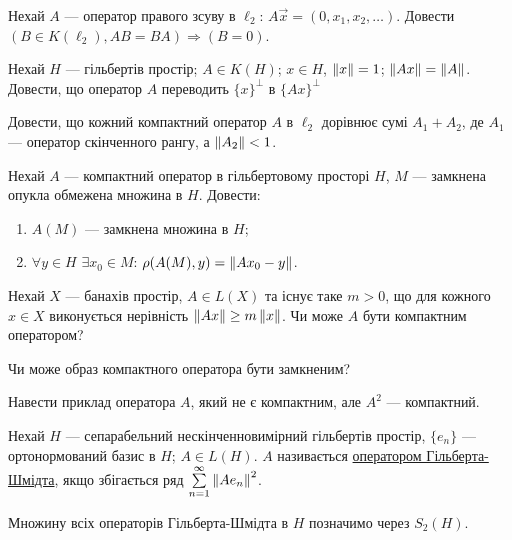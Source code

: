 \begin{exercise}
    Нехай $A$ --- оператор правого зсуву в $\ell_2$: $A\vec{x} = (0,x_1,x_2,\dots)$.
    Довести $(B \in K(\ell_2), AB=BA) \Rightarrow (B=0)$.
\end{exercise}

\begin{exercise}\label{N:1_5_33}
    Нехай $H$ --- гільбертів простір; $A \in K(H)$; $x \in H$, $\left\lVert x\right\rVert = 1$;
    $\left\lVert Ax\right\rVert = \left\lVert A\right\rVert$. Довести, що оператор $A$ переводить $\{x\}^\perp$
    в $\{Ax\}^\perp$
\end{exercise}

\begin{exercise}
    Довести, що кожний компактний оператор $A$ в $\ell_2$ дорівнює сумі $A_1 + A_2$,
    де $A_1$ --- оператор скінченного рангу, а $\left\lVert A_2\right\rVert<1$.
\end{exercise}

\begin{exercise}
    Нехай $A$ --- компактний оператор в гільбертовому просторі $H$, $M$ ---
    замкнена опукла обмежена множина в $H$. Довести:
    \begin{enumerate}
        \item $A(M)$ --- замкнена множина в $H$;
        \item $\forall y \in H$ $\exists x_0 \in M$: $\rho(A(M),y) = \left\lVert Ax_0 - y\right\rVert$.
    \end{enumerate}
\end{exercise}

\begin{exercise}
    Нехай $X$ --- банахів простір, $A \in L(X)$ та існує таке $m>0$, що для кожного
    $x \in X$ виконується нерівність $\left\lVert Ax\right\rVert \geq m \left\lVert x\right\rVert$. Чи може $A$ бути
    компактним оператором?
\end{exercise}

\begin{exercise}
    Чи може образ компактного оператора бути замкненим?
\end{exercise}

\begin{exercise}
    Навести приклад оператора $A$, який не є компактним, але $A^2$ --- компактний.
\end{exercise}

\begin{theory}
    Нехай $H$ --- сепарабельний нескінченновимірний гільбертів простір, $\{e_n\}$ ---
    ортонормований базис в $H$; $A \in L(H)$. $A$ називається \ul{оператором
    Гільберта-Шмідта}, якщо збігається ряд $\sum\limits^\infty_{n=1} \left\lVert A e_n\right\rVert^2$.

    Множину всіх операторів Гільберта-Шмідта в $H$ позначимо через $S_2(H)$. 
\end{theory}
